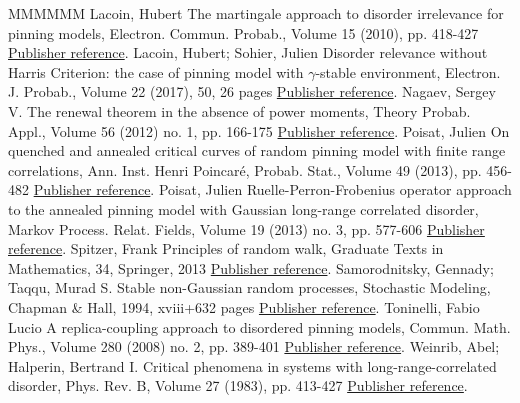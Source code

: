 \documentclass[11pt]{article}
\theoremstyle{definition}
\numberwithin{equation}{section}
\numberwithin{figure}{section}
\numberwithin{table}{section}
\begin{document}
\begin{thebibliography}{MMMMMM}
 Lacoin, Hubert The martingale approach to disorder irrelevance for pinning models, Electron. Commun. Probab., Volume 15 (2010), pp. 418-427 \href{https://ahl.centre-mersenne.org/item/AHL_2019__2__281_0/#L10}{Publisher reference}.
 Lacoin, Hubert; Sohier, Julien Disorder relevance without Harris Criterion: the case of pinning model with \(\gamma\)-stable environment, Electron. J. Probab., Volume 22 (2017), 50, 26 pages \href{https://ahl.centre-mersenne.org/item/AHL_2019__2__281_0/#LS16+}{Publisher reference}.
 Nagaev, Sergey V. The renewal theorem in the absence of power moments, Theory Probab. Appl., Volume 56 (2012) no. 1, pp. 166-175 \href{https://ahl.centre-mersenne.org/item/AHL_2019__2__281_0/#Na2012}{Publisher reference}.
 Poisat, Julien On quenched and annealed critical curves of random pinning model with finite range correlations, Ann. Inst. Henri Poincaré, Probab. Stat., Volume 49 (2013), pp. 456-482 \href{https://ahl.centre-mersenne.org/item/AHL_2019__2__281_0/#P13a}{Publisher reference}.
 Poisat, Julien Ruelle-Perron-Frobenius operator approach to the annealed pinning model with Gaussian long-range correlated disorder, Markov Process. Relat. Fields, Volume 19 (2013) no. 3, pp. 577-606 \href{https://ahl.centre-mersenne.org/item/AHL_2019__2__281_0/#P13}{Publisher reference}.
 Spitzer, Frank Principles of random walk, Graduate Texts in Mathematics, 34, Springer, 2013 \href{https://ahl.centre-mersenne.org/item/AHL_2019__2__281_0/#Spitzer}{Publisher reference}.
 Samorodnitsky, Gennady; Taqqu, Murad S. Stable non-Gaussian random processes, Stochastic Modeling, Chapman \& Hall, 1994, xviii+632 pages \href{https://ahl.centre-mersenne.org/item/AHL_2019__2__281_0/#ST94}{Publisher reference}.
 Toninelli, Fabio Lucio A replica-coupling approach to disordered pinning models, Commun. Math. Phys., Volume 280 (2008) no. 2, pp. 389-401 \href{https://ahl.centre-mersenne.org/item/AHL_2019__2__281_0/#T08}{Publisher reference}.
 Weinrib, Abel; Halperin, Bertrand I. Critical phenomena in systems with long-range-correlated disorder, Phys. Rev. B, Volume 27 (1983), pp. 413-427 \href{https://ahl.centre-mersenne.org/item/AHL_2019__2__281_0/#WH83}{Publisher reference}.
\end{thebibliography}
\end{document}
